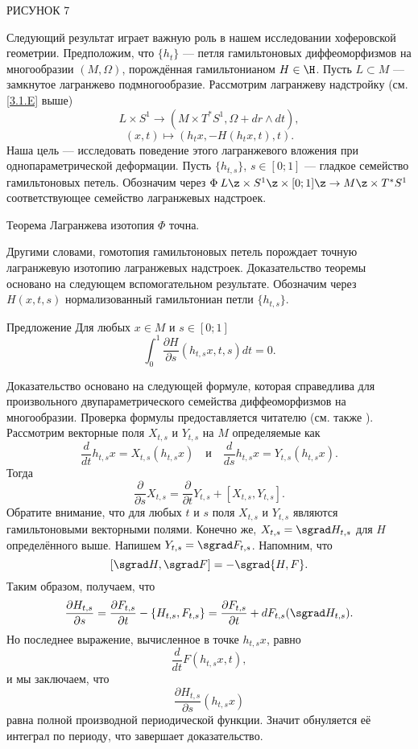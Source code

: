РИСУНОК 7

Следующий результат играет важную роль в нашем исследовании хоферовской геометрии.
Предположим, что $\{h_t\}$ --- петля гамильтоновых диффеоморфизмов на многообразии $(M, \Omega)$, порождённая гамильтонианом $H \in \H$.
Пусть $L \subset M$ --- замкнутое лагранжево подмногообразие.
Рассмотрим лагранжеву надстройку (см. \ref{3.1.E} выше)
\[L \times S^1 \to (M \times T^\ast S^1, \Omega + dr \wedge dt),\]
\[(x, t) \mapsto (h_t x, -H (h_t x, t), t).\]
Наша цель --- исследовать поведение этого лагранжевого вложения при однопараметрической деформации.
Пусть $\{h_{t, s}\}$, $s \in [0; 1]$ --- гладкое семейство гамильтоновых петель.
Обозначим через $\Phi\: L \z\times S^1 \z\times [0; 1] \z\to M \z\times T^\ast S^1$ соответствующее семейство лагранжевых надстроек.

\begin{thm}{Теорема}\label{6.1.B}
Лагранжева изотопия $\Phi$ точна.
\end{thm}

Другими словами, гомотопия гамильтоновых петель порождает точную лагранжевую изотопию лагранжевых надстроек.
Доказательство теоремы основано на следующем вспомогательном результате.
Обозначим через $H (x, t, s)$ нормализованный гамильтониан петли $\{h_{t, s}\}$.

\begin{thm}{Предложение}\label{6.1.C}
Для любых $x \in M$ и $s \in [0; 1]$
\[\int_0^1 \frac{\partial H}{\partial s} (h_{t, s} x, t, s) dt = 0.\]
\end{thm}

Доказательство основано на следующей формуле, которая справедлива для произвольного двупараметрического семейства диффеоморфизмов на многообразии.
Проверка формулы предоставляется читателю (см. также \cite{B1}).
Рассмотрим векторные поля $X_{t, s}$ и $Y_{t, s}$ на $M$ определяемые как 
\[\frac{d}{dt} h_{t, s} x = X_{t, s} (h_{t, s} x)
\quad\text{и}\quad
\frac{d}{ds} h_{t, s} x = Y_{t, s} (h_{t, s} x).
\]
Тогда 
\[\frac{\partial}{\partial s}  X_{t, s} = \frac{\partial}{\partial t}Y_{t, s} + [X_{t, s}, Y_{t, s}].\]
Обратите внимание, что для любых $t$ и $s$ поля $X_{t, s}$ и $Y_{t, s}$ являются гамильтоновыми векторными полями.
Конечно же, $X_{t, s} = \sgrad H_{t, s}$ для $H$ определённого выше.
Напишем $Y_{t, s} = \sgrad F_{t, s}$.
Напомним, что 
\[[\sgrad H, \sgrad F] = -\sgrad  \{H, F\}.\]
Таким образом, получаем, что 
\[\frac{\partial H_{t, s}}{\partial s}
= \frac{\partial F_{t, s}}{\partial t} - \{H_{t, s}, F_{t, s}\}
= \frac{\partial F_{t, s}}{\partial t}+dF_{t,s}(\sgrad H_{t,s}).
\]
Но последнее выражение, вычисленное в точке $h_{t, s} x$, равно
\[\frac{d}{dt} F (h_{t, s} x, t),\]
и мы заключаем, что 
\[\frac{\partial H_{t, s}}{\partial s} (h_{t, s} x)\]
равна полной производной периодической функции.
Значит обнуляется её интеграл по периоду, что завершает доказательство.
\qeds

